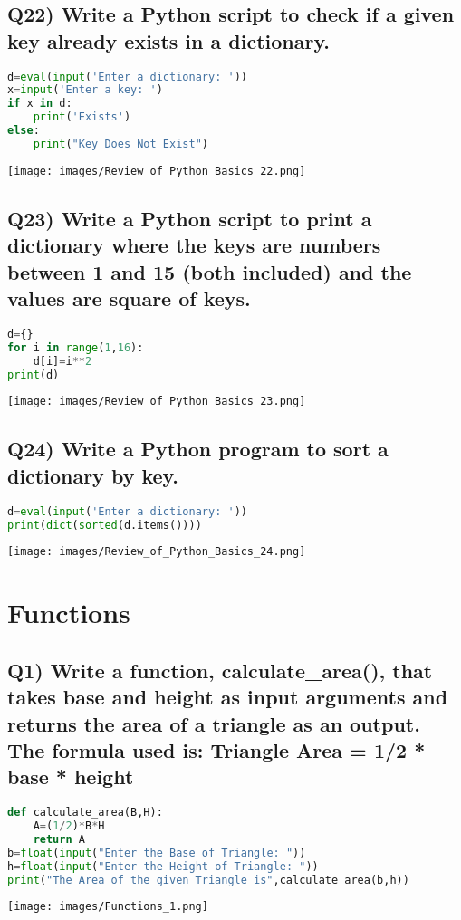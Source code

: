 \documentclass{article}
\begin{document}
\subsection*{Q22) Write a Python script to check if a given key already exists in a dictionary.}
\begin{lstlisting}[language=Python]
d=eval(input('Enter a dictionary: '))
x=input('Enter a key: ')
if x in d:
    print('Exists')
else:
    print("Key Does Not Exist")
\end{lstlisting}
\texttt{[image: images/Review\_of\_Python\_Basics\_22.png]}

\subsection*{Q23) Write a Python script to print a dictionary where the keys are numbers between 1 and 15 (both included) and the values are square of keys.}
\begin{lstlisting}[language=Python]
d={}
for i in range(1,16):
    d[i]=i**2
print(d)
\end{lstlisting}
\texttt{[image: images/Review\_of\_Python\_Basics\_23.png]}

\subsection*{Q24) Write a Python program to sort a dictionary by key.}
\begin{lstlisting}[language=Python]
d=eval(input('Enter a dictionary: '))
print(dict(sorted(d.items())))
\end{lstlisting}
\texttt{[image: images/Review\_of\_Python\_Basics\_24.png]}

\section{Functions}

\subsection*{Q1) Write a function, calculate\_area(), that takes base and height as input arguments and returns the area of a triangle as an output. The formula used is: Triangle Area = 1/2 * base * height}
\begin{lstlisting}[language=Python]
def calculate_area(B,H):
    A=(1/2)*B*H
    return A
b=float(input("Enter the Base of Triangle: "))
h=float(input("Enter the Height of Triangle: "))
print("The Area of the given Triangle is",calculate_area(b,h))
\end{lstlisting}
\texttt{[image: images/Functions\_1.png]}
\end{document}
